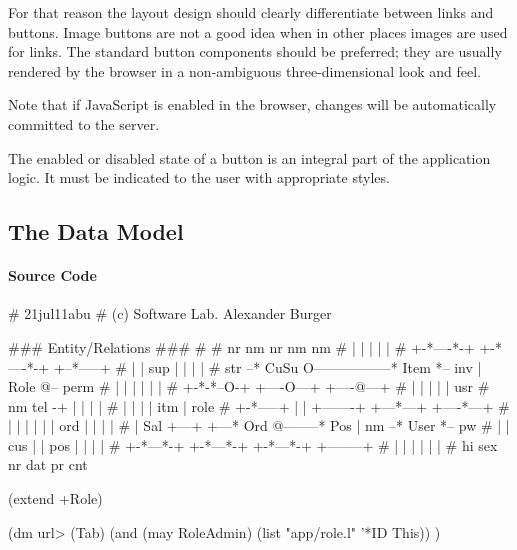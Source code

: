 For that reason the layout design should clearly differentiate between
links and buttons. Image buttons are not a good idea when in other
places images are used for links. The standard button components should
be preferred; they are usually rendered by the browser in a
non-ambiguous three-dimensional look and feel.

Note that if JavaScript is enabled in the browser, changes will be
automatically committed to the server.

The enabled or disabled state of a button is an integral part of the
application logic. It must be indicated to the user with appropriate
styles.

\subsection{The Data Model}
\label{sec:appl-devel-the-data-model}

\paragraph{Source Code}
\label{sec:appl-devel-data-model-source-code}

\begin{wideverbatim}

# 21jul11abu
# (c) Software Lab. Alexander Burger

### Entity/Relations ###
#
#           nr    nm                   nr    nm               nm
#            |    |                     |    |                |
#          +-*----*-+                 +-*----*-+           +--*-----+
#          |        |             sup |        |           |        |
#    str --*  CuSu  O-----------------*  Item  *-- inv     |  Role  @-- perm
#          |        |                 |        |           |        |
#          +-*-*--O-+                 +----O---+           +----@---+
#            | |  |                        |                    | usr
#   nm  tel -+ |  |                        |                    |
#    |         |  |                        | itm                | role
#  +-*-----+   |  |   +-------+        +---*---+           +----*---+
#  |       |   |  |   |       |    ord |       |           |        |
#  |  Sal  +---+  +---*  Ord  @--------*  Pos  |      nm --*  User  *-- pw
#  |       |      cus |       | pos    |       |           |        |
#  +-*---*-+          +-*---*-+        +-*---*-+           +--------+
#    |   |              |   |            |   |
#   hi   sex           nr  dat          pr   cnt


(extend +Role)

(dm url> (Tab)
   (and (may RoleAdmin) (list "app/role.l" '*ID This)) )

\end{wideverbatim}

